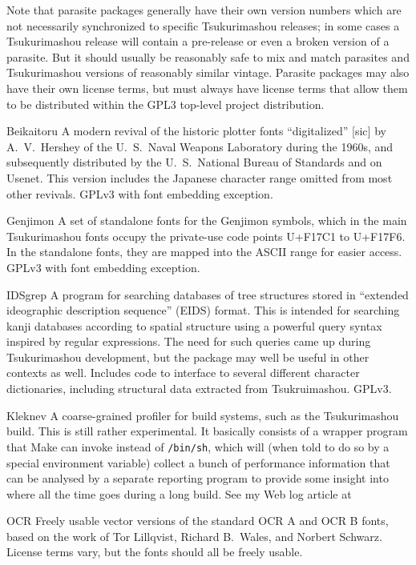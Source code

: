 \documentclass[14pt]{extarticle}
\begin{document}
Note that parasite packages generally have their own version numbers which
are not necessarily synchronized to specific Tsukurimashou releases; in some
cases a Tsukurimashou release will contain a pre-release or even a broken
version of a parasite.  But it should usually be reasonably safe to mix and
match parasites and Tsukurimashou versions of reasonably similar vintage. 
Parasite packages may also have their own license terms, but must always
have license terms that allow them to be distributed within the GPL3
top-level project distribution.

\begin{description}
  \item{Beikaitoru} A modern revival of the historic plotter fonts
    ``digitalized'' [sic] by A.\ V.\ Hershey of the U.\ S.\ Naval
    Weapons Laboratory during the 1960s, and subsequently distributed by the
    U.\ S.\ National Bureau of Standards and on Usenet.  This version
    includes the Japanese character range omitted from most other revivals.
    GPLv3 with font embedding exception.

  \item{Genjimon} A set of standalone fonts for the Genjimon symbols, which
    in the main Tsukurimashou fonts occupy the private-use code points
    U+F17C1 to U+F17F6.  In the standalone fonts, they are mapped into the
    ASCII range for easier access.  GPLv3 with font embedding exception.

  \item{IDSgrep} A program for searching databases of tree structures stored
    in ``extended ideographic description sequence'' (EIDS) format.  This is
    intended for searching kanji databases according to spatial structure
    using a powerful query syntax inspired by regular expressions.  The need
    for such queries came up during Tsukurimashou development, but the
    package may well be useful in other contexts as well.  Includes code to
    interface to several different character dictionaries, including
    structural data extracted from Tsukruimashou.  GPLv3.

  \item{Kleknev} A coarse-grained profiler for build systems, such as the
    Tsukurimashou build.  This is still rather experimental.  It basically
    consists of a wrapper program that Make can invoke instead of
    \texttt{/bin/sh}, which will (when told to do so by a special
    environment variable) collect a bunch of performance information that
    can be analysed by a separate reporting program to provide some insight
    into where all the time goes during a long build.  See my Web log
    article at 

  \item{OCR} Freely usable vector versions of the standard OCR A and OCR B
    fonts, based on the work of Tor Lillqvist, Richard B.\ Wales, and
    Norbert Schwarz.  License terms vary, but the fonts should all be
    freely usable.
\end{description}
\end{document}
